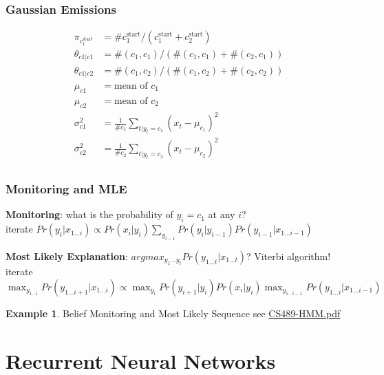 \documentclass[]{article}
\theoremstyle{definition}
\newtheorem{ex}{Example}[section]
\begin{document}
\subsubsection{Gaussian Emissions}
\label{ssub:Gaussian Emissions}


\begin{align*}
    \pi_{c_1^{\text{start}}} &= \# c_1^{\text{start}} / (c_1^{\text{start}} + c_2^{\text{start}}) \\
    \theta_{c1|c1} &= \#(c_1, c_1) / (\#(c_1, c_1) + \#(c_2, c_1)) \\
    \theta_{c1|c2} &= \#(c_1, c_2) / (\#(c_1, c_2) + \#(c_2, c_2)) \\
    \mu_{c1} &= \text{mean of } c_1 \\
    \mu_{c2} &= \text{mean of } c_2 \\
    \sigma_{c1}^2 &= \frac{1}{\# c_1} \sum_{t | y_t = c_1} (x_t - \mu_{c_1})^2 \\
    \sigma_{c2}^2 &= \frac{1}{\# c_2} \sum_{t | y_t = c_2} (x_t - \mu_{c_2})^2 \\
\end{align*}

\subsubsection{Monitoring and MLE}
\label{ssub:Monitoring and ML}

\textbf{Monitoring}: what is the probability of $y_i = c_1$ at any $i$? \\
iterate $Pr(y_i | x_{1 \ldots i}) \propto Pr(x_i | y_i) \sum_{y_{i-1}} Pr(y_i | y_{i-1}) Pr(y_{i-1} | x_{1 \ldots i-1})$

\medskip

\textbf{Most Likely Explanation}: $argmax_{y_1 \ldots y_t} Pr(y_{1 \ldots t} | x_{1 \ldots t})$? Viterbi algorithm! \\
iterate $\max_{y_{1 \ldots i}} Pr(y_{1 \ldots i+1} | x_{1 \ldots i}) \propto \max_{y_i} Pr(y_{i+1} | y_i) Pr(x_i | y_i) \max_{y_{1 \ldots i-1}} Pr(y_{1 \ldots i} | x_{1 \ldots i-1})$

\begin{ex}{Belief Monitoring and Most Likely Sequence}
    see \href{./cs489-HMM.pdf}{CS489-HMM.pdf}
\end{ex}

\section{Recurrent Neural Networks}
\label{sec:recurrent_neural_networks}
\end{document}
